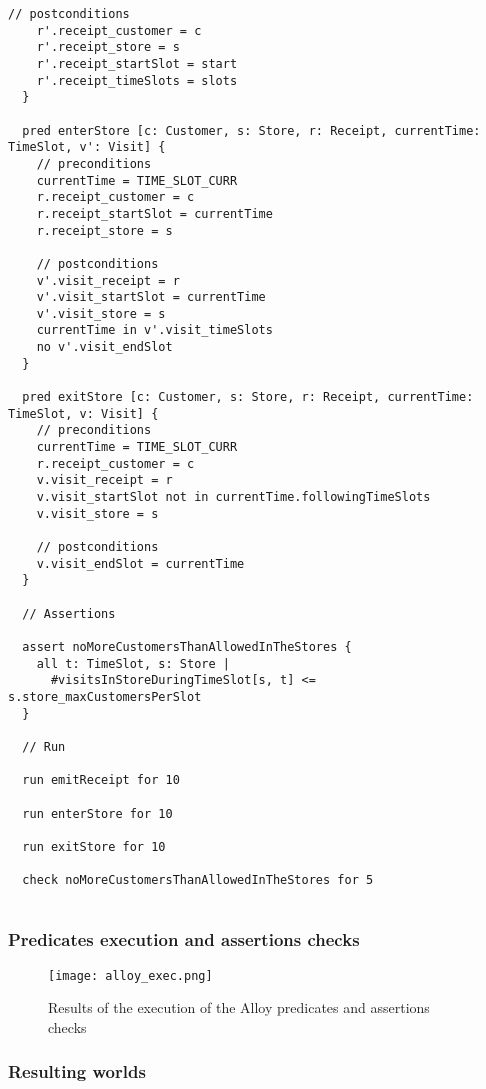 \documentclass[../../main.tex]{subfiles}
\begin{document}
\begin{lstlisting}[language=alloy]
    // postconditions
    r'.receipt_customer = c
    r'.receipt_store = s
    r'.receipt_startSlot = start
    r'.receipt_timeSlots = slots
  }
  
  pred enterStore [c: Customer, s: Store, r: Receipt, currentTime: TimeSlot, v': Visit] {
    // preconditions
    currentTime = TIME_SLOT_CURR
    r.receipt_customer = c
    r.receipt_startSlot = currentTime
    r.receipt_store = s
  
    // postconditions
    v'.visit_receipt = r
    v'.visit_startSlot = currentTime
    v'.visit_store = s
    currentTime in v'.visit_timeSlots
    no v'.visit_endSlot
  }
  
  pred exitStore [c: Customer, s: Store, r: Receipt, currentTime: TimeSlot, v: Visit] {
    // preconditions
    currentTime = TIME_SLOT_CURR
    r.receipt_customer = c
    v.visit_receipt = r
    v.visit_startSlot not in currentTime.followingTimeSlots
    v.visit_store = s
    
    // postconditions
    v.visit_endSlot = currentTime
  }
  
  // Assertions
  
  assert noMoreCustomersThanAllowedInTheStores {
    all t: TimeSlot, s: Store |
      #visitsInStoreDuringTimeSlot[s, t] <= s.store_maxCustomersPerSlot
  }
  
  // Run
  
  run emitReceipt for 10
  
  run enterStore for 10
  
  run exitStore for 10
  
  check noMoreCustomersThanAllowedInTheStores for 5
  
\end{lstlisting}

\subsubsection{Predicates execution and assertions checks}

\begin{figure}[H]
  \centering
  \texttt{[image: alloy\_exec.png]}
  \caption{Results of the execution of the Alloy predicates and assertions checks}
\end{figure}

\subsubsection{Resulting worlds}
\end{document}

